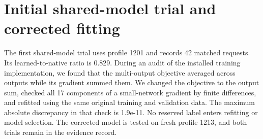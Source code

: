 \section{Initial shared-model trial and corrected fitting}
The first shared-model trial uses profile 1201 and records 42 matched requests. Its learned-to-native ratio is 0.829. During an audit of the installed training implementation, we found that the multi-output objective averaged across outputs while its gradient summed them. We changed the objective to the output sum, checked all 17 components of a small-network gradient by finite differences, and refitted using the same original training and validation data. The maximum absolute discrepancy in that check is 1.9e-11. No reserved label enters refitting or model selection. The corrected model is tested on fresh profile 1213, and both trials remain in the evidence record.
